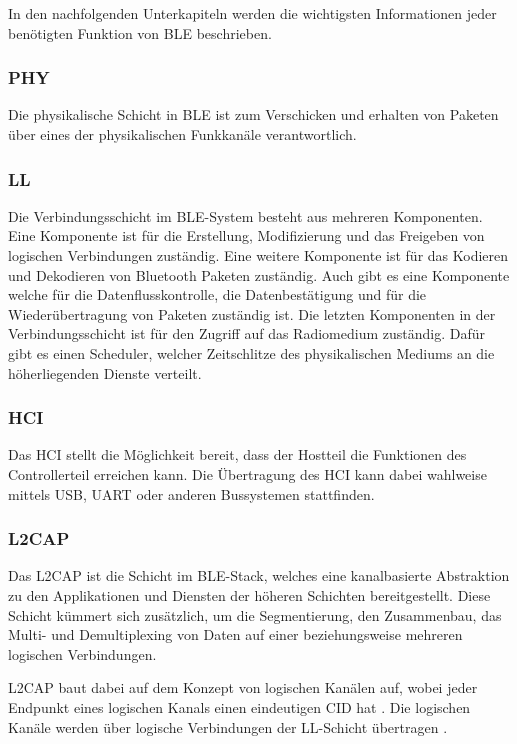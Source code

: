 In den nachfolgenden Unterkapiteln werden die wichtigsten Informationen jeder benötigten Funktion von \ac{BLE} beschrieben.

\subsubsection{\acf{PHY}}
Die physikalische Schicht in \ac{BLE} ist zum Verschicken und erhalten von Paketen über eines der physikalischen Funkkanäle verantwortlich. \cite[S.~209]{bluetoothCore}

\subsubsection{\acf{LL}}
Die Verbindungsschicht im \ac{BLE}-System besteht aus mehreren Komponenten. Eine Komponente ist für die Erstellung, Modifizierung und das Freigeben von logischen Verbindungen zuständig. Eine weitere Komponente ist für das Kodieren und Dekodieren von Bluetooth Paketen zuständig. Auch gibt es eine Komponente welche für die Datenflusskontrolle, die Datenbestätigung und für die Wiederübertragung von Paketen zuständig ist. Die letzten Komponenten in der Verbindungsschicht ist für den Zugriff auf das Radiomedium zuständig. Dafür gibt es einen Scheduler, welcher Zeitschlitze des physikalischen Mediums an die höherliegenden Dienste verteilt. \cite[S.~207f.]{bluetoothCore}

\subsubsection{\acf{HCI}}
Das \acl{HCI} stellt die Möglichkeit bereit, dass der Hostteil die Funktionen des Controllerteil erreichen kann. Die Übertragung des \ac{HCI} kann dabei wahlweise mittels USB, UART oder anderen Bussystemen stattfinden. \cite[S.~1735f.]{bluetoothCore}

\subsubsection{\acf{L2CAP}}
Das \acl{L2CAP} ist die Schicht im \ac{BLE}-Stack, welches eine kanalbasierte Abstraktion zu den Applikationen und Diensten der höheren Schichten bereitgestellt. Diese Schicht kümmert sich zusätzlich, um die Segmentierung, den Zusammenbau, das Multi- und Demultiplexing von Daten auf einer beziehungsweise mehreren logischen Verbindungen. \cite[S.~195, S.~1013]{bluetoothCore}

\acl{L2CAP} baut dabei auf dem Konzept von logischen Kanälen auf, wobei jeder Endpunkt eines logischen Kanals einen eindeutigen \ac{CID} hat \cite[S.~1021]{bluetoothCore}. Die logischen Kanäle werden über logische Verbindungen der \ac{LL}-Schicht übertragen \cite[S.~1013]{bluetoothCore}.

